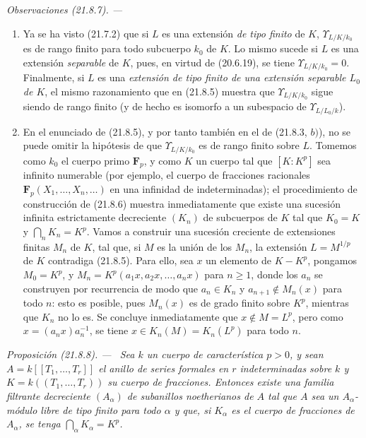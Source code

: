 \documentclass[10pt,oneside]{book}
\makeatletter
\newcommand{\setmanualcurrentlabel}[1]{\def\@currentlabel{#1}}
\newcommand{\oldpage}[2][]{%
  \setcounter{footnote}{0}%
  \marginpar{\scriptsize\textbf{#1}~|~#2}\ignorespaces}
\newenvironment{proposition}[1][]{%
  \setmanualcurrentlabel{#1}\par\medskip\noindent\itshape Proposición (#1). ---\ }{\par}
\newenvironment{remarks}[1][]{%
  \setmanualcurrentlabel{#1}\par\medskip\noindent\itshape Observaciones (#1). ---\ }{\par}
\providecommand{\setmin}{-}%
\makeatother
\begin{document}
\begin{remarks}[21.8.7]
\label{0.21.8.7-es}
\begin{enumerate}
  \item[(i)] Ya se ha visto (21.7.2) que si $L$ es una extensión
  \emph{de tipo finito} de $K$, $\Upsilon_{L/K/k_0}$ es de rango finito para
  todo subcuerpo $k_0$ de $K$. Lo mismo sucede si $L$ es una extensión
  \emph{separable} de $K$, pues, en virtud de (20.6.19), se tiene
  $\Upsilon_{L/K/k_0}=0$. Finalmente, si $L$ es una \emph{extensión de tipo
  finito de una extensión separable $L_0$ de $K$}, el mismo razonamiento que
  en (21.8.5) muestra que $\Upsilon_{L/K/k_0}$ sigue siendo de rango finito
  (y de hecho es isomorfo a un subespacio de $\Upsilon_{L/L_0/k}$).

  \oldpage[0\textsubscript{IV-1}]{175}
  \item[(ii)] En el enunciado de (21.8.5), y por tanto también en el de
  (21.8.3, $b)$), no se puede omitir la hipótesis de que
  $\Upsilon_{L/K/k_0}$ es de rango finito sobre $L$. Tomemos como $k_0$ el
  cuerpo primo $\mathbf F_p$, y como $K$ un cuerpo tal que $[K:K^p]$ sea
  infinito numerable (por ejemplo, el cuerpo de fracciones racionales
  $\mathbf F_p(X_1,\ldots,X_n,\ldots)$ en una infinidad de indeterminadas); el
  procedimiento de construcción de (21.8.6) muestra inmediatamente que existe
  una sucesión infinita estrictamente decreciente $(K_n)$ de subcuerpos de $K$
  tal que $K_0=K$ y $\bigcap_nK_n=K^p$. Vamos a construir una sucesión
  creciente de extensiones finitas $M_n$ de $K$, tal que, si $M$ es la unión
  de los $M_n$, la extensión $L=M^{1/p}$ de $K$ contradiga (21.8.5). Para
  ello, sea $x$ un elemento de $K\setmin K^p$, pongamos $M_0=K^p$, y
  $M_n=K^p(a_1x,a_2x,\ldots,a_nx)$ para $n\geqslant1$, donde los $a_n$ se
  construyen por recurrencia de modo que $a_n\in K_n$ y
  $a_{n+1}\notin M_n(x)$ para todo $n$: esto es posible, pues $M_n(x)$ es de
  grado finito sobre $K^p$, mientras que $K_n$ no lo es. Se concluye
  inmediatamente que $x\notin M=L^p$, pero como $x=(a_nx)a_n^{-1}$, se tiene
  $x\in K_n(M)=K_n(L^p)$ para todo $n$.
\end{enumerate}
\end{remarks}

\begin{proposition}[21.8.8]
\label{0.21.8.8-es}
Sea $k$ un cuerpo de característica $p>0$, y sean
$A=k[[T_1,\ldots,T_r]]$ el anillo de series formales en $r$ indeterminadas
sobre $k$ y $K=k((T_1,\ldots,T_r))$ su cuerpo de fracciones. Entonces existe
una familia filtrante decreciente $(A_\alpha)$ de subanillos noetherianos de
$A$ tal que $A$ sea un $A_\alpha$-módulo libre de tipo finito para todo
$\alpha$ y que, si $K_\alpha$ es el cuerpo de fracciones de $A_\alpha$, se
tenga $\bigcap_\alpha K_\alpha=K^p$.
\end{proposition}
\end{document}
